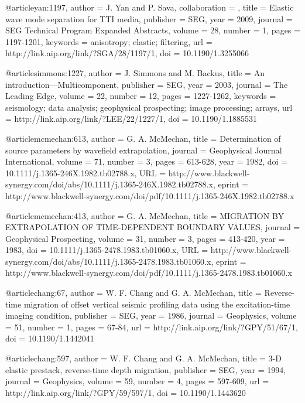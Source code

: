 {@article{yan:1197,
author = {J. Yan and P. Sava},
collaboration = {},
title = {Elastic wave mode separation for {TTI} media},
publisher = {SEG},
year = {2009},
journal = {SEG Technical Program Expanded Abstracts},
volume = {28},
number = {1},
pages = {1197-1201},
keywords = {anisotropy; elastic; filtering},
url = {http://link.aip.org/link/?SGA/28/1197/1},
doi = {10.1190/1.3255066}
}






@article{simmons:1227,
  author =	 {J. Simmons and M. Backus},
  title =	 {An introduction---{M}ulticomponent},
  publisher =	 {SEG},
  year =	 2003,
  journal =	 {The Leading Edge},
  volume =	 22,
  number =	 12,
  pages =	 {1227-1262},
  keywords =	 {seismology; data analysis; geophysical prospecting;
                  image processing; arrays},
  url =		 {http://link.aip.org/link/?LEE/22/1227/1},
  doi =		 {10.1190/1.1885531}
}

@article{mcmechan:613,
  author =	 {G. A. McMechan},
  title =	 {Determination of source parameters by wavefield
                  extrapolation},
  journal =	 {Geophysical Journal International},
  volume =	 71,
  number =	 3,
  pages =	 {613-628},
  year =	 1982,
  doi =		 {10.1111/j.1365-246X.1982.tb02788.x},
  URL =
                  {http://www.blackwell-synergy.com/doi/abs/10.1111/j.1365-246X.1982.tb02788.x},
  eprint =
                  {http://www.blackwell-synergy.com/doi/pdf/10.1111/j.1365-246X.1982.tb02788.x}
}

@article{mcmechan:413,
  author =	 {G. A. McMechan},
  title =	 {MIGRATION BY EXTRAPOLATION OF TIME-DEPENDENT
                  BOUNDARY VALUES},
  journal =	 {Geophysical Prospecting},
  volume =	 31,
  number =	 3,
  pages =	 {413-420},
  year =	 1983,
  doi =		 {10.1111/j.1365-2478.1983.tb01060.x},
  URL =
                  {http://www.blackwell-synergy.com/doi/abs/10.1111/j.1365-2478.1983.tb01060.x},
  eprint =
                  {http://www.blackwell-synergy.com/doi/pdf/10.1111/j.1365-2478.1983.tb01060.x}
}

@article{chang:67,
  author =	 {W. F. Chang and G. A. McMechan},
  title =	 {Reverse-time migration of offset vertical seismic
                  profiling data using the excitation-time imaging
                  condition},
  publisher =	 {SEG},
  year =	 1986,
  journal =	 {Geophysics},
  volume =	 51,
  number =	 1,
  pages =	 {67-84},
  url =		 {http://link.aip.org/link/?GPY/51/67/1},
  doi =		 {10.1190/1.1442041}
}

@article{chang:597,
  author =	 {W. F. Chang and G. A. McMechan},
  title =	 {3-{D} elastic prestack, reverse-time depth
                  migration},
  publisher =	 {SEG},
  year =	 1994,
  journal =	 {Geophysics},
  volume =	 59,
  number =	 4,
  pages =	 {597-609},
  url =		 {http://link.aip.org/link/?GPY/59/597/1},
  doi =		 {10.1190/1.1443620}
}

}
